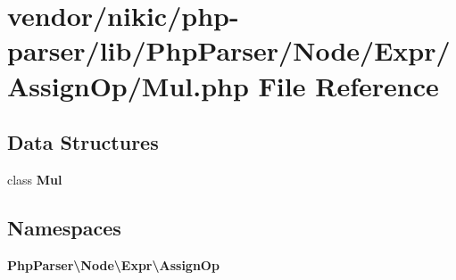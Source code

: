 \section{vendor/nikic/php-\/parser/lib/\+Php\+Parser/\+Node/\+Expr/\+Assign\+Op/\+Mul.php File Reference}
\label{_assign_op_2_mul_8php}
\subsection*{Data Structures}
\begin{DoxyCompactItemize}
\item 
class {\bf Mul}
\end{DoxyCompactItemize}
\subsection*{Namespaces}
\begin{DoxyCompactItemize}
\item 
 {\bf Php\+Parser\textbackslash{}\+Node\textbackslash{}\+Expr\textbackslash{}\+Assign\+Op}
\end{DoxyCompactItemize}
